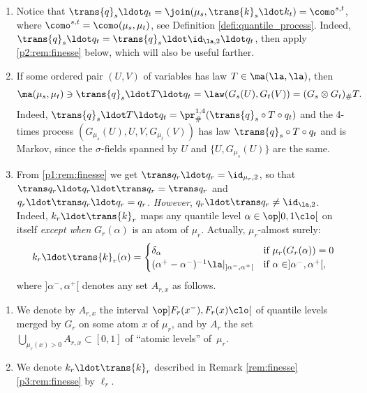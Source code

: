 \skpt
\begin{rem}\label{rem:finesse}
\begin{enumerate}
\item
\label{p1:rem:finesse} Notice that $\trans{q}_s \ldot q_t=\join(\mu_s,\trans{k}_s \ldot k_t)=\como^{s,t}$, where $\como^{s,t}=\como(\mu_s,\mu_t)$, see Definition \ref{defi:quantile_process}. Indeed, $\trans{q}_s \ldot q_t=\trans{q}_s \ldot\id_{\la,2}{}\ldot q_t$, then apply \eqref{p2:rem:finesse} below,
which will also be useful farther.

\item
\label{p2:rem:finesse} If some ordered pair $(U,V)$ of variables has law $T\in \ma(\la,\la)$, then\vspace*{-3pt}
\[
\ma(\mu_s,\mu_t)\ni\trans{q}_s \ldot T\ldot q_t=\law(G_s(U),G_t(V))=(G_s\otimes G_t)_\#T.
\]
Indeed, $\trans{q}_s \ldot T\ldot q_t=\pr^{1,4}_\#(\trans{q}_s \circ T\circ q_t)$ and the 4-times process $(G_{\mu_s}(U),U,V,G_{\mu_t}(V))$ has law $\trans{q}_s \circ T\circ q_t$ and is Markov, since the $\sigma$-fields spanned by $U$ and $\{U,G_{\mu_s}(U)\}$ are the same.

\item
\label{p3:rem:finesse} From \eqref{p1:rem:finesse} we get $\trans q_r\ldot q_r=\id_{\mu_r,2}$, so that $\trans q_r\ldot q_r\ldot\trans q_r=\trans q_r$ and $q_r\ldot\trans q_r\ldot q_r=q_r$. \emph{However}, $q_r\ldot\trans q_r\neq \id_{\la,2}$. Indeed, $k_r\ldot\trans{k}_r$ maps any quantile level $\alpha\in \op]0,1\clo[$ on itself \emph{except when} $G_r(\alpha)$ is an atom of $\mu_r$. Actually, $\mu_r$-almost surely:\vspace*{-3pt}
\begin{align*}
k_r\ldot\trans{k}_r(\alpha)=
\begin{cases}
\delta_\alpha&\text{if }\mu_r(G_{r}(\alpha))=0\\
(\alpha^+-\alpha^-)^{-1}\la|_{]\alpha^-,\alpha^+[}&\text{if }\alpha\in]\alpha^-,\alpha^+[,
\end{cases}
\end{align*}
where $]\alpha^-,\alpha^+[$ denotes any set $A_{r,x}$ as follows.
\end{enumerate}
\end{rem}

\skpt
\begin{notation}\label{nota:Asx}
\begin{enumerate}
\item
\label{p:Asx} We denote by $A_{r,x}$ the interval $\op]F_r(x^-),F_r(x)\clo[$ of quantile levels merged by $G_r$ on some atom $x$ of $\mu_r$, and by $A_r$ the set $\bigcup_{\mu_r(x)>0}A_{r,x}\!\subset\! [0,1]$ of ``atomic levels'' of~$\mu_r$.

\item
\label{p:l_R_fini} We denote $k_r\ldot\trans{k}_r$ described in Remark \ref{rem:finesse}\eqref{p3:rem:finesse} by $\ell_r$.
\end{enumerate}
\end{notation}

